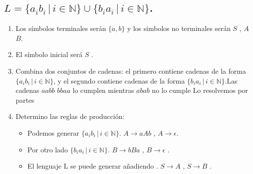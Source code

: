 \documentclass{article}
\begin{document}
        \subsection{$L = \{a_i b_i \,|\, i \in \mathbb{N}\} \cup \{b_i a_i \,|\, i \in \mathbb{N\}}$.}
        \begin{flushleft}
            \begin{enumerate}
                \item Los símbolos terminales serán $\{a,b\}$ y los simbolos no terminales serán $S$ , $A$ $B$.
                \item El símbolo inicial será $S$ .
                \item Combina dos conjuntos de cadenas: el primero contiene cadenas de la forma $\{a_i b_i \,|\, i \in \mathbb{N}\}$, y el segundo contiene cadenas de la forma $\{b_i a_i \,|\, i \in \mathbb{N}\}$.Las cadenas $aabb$ $bbaa$ lo cumplen mientras $abab$ no lo cumple Lo resolvemos por partes
                \item Determino las reglas de producción:
                
                \begin{itemize}
                    \item Podemos generar $\{a_i b_i \,|\, i \in \mathbb{N}\}. $
                        \subitem $A \rightarrow aAb$ , $A \rightarrow \epsilon$. 
                    \item Por otro lado $\{b_i a_i \,|\, i \in \mathbb{N}\}$.
                        \subitem $B \rightarrow bBa$ , $B \rightarrow \epsilon$ . 
                    \item El lenguaje L se puede generar añadiendo .
                        \subitem $S \rightarrow A$ , $S \rightarrow B$ . 
                \end{itemize}


\end{enumerate}
\end{flushleft}
\end{document}
